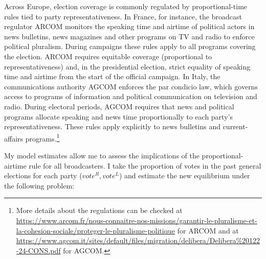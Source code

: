 \documentclass[12pt]{article}
\begin{document}
Across Europe, election coverage is commonly regulated by proportional-time rules tied to party representativeness. In France, for instance, the broadcast regulator ARCOM monitors  the speaking time and airtime of political actors in news bulletins, news magazines and other programs on TV and radio to enforce political pluralism. During campaigns these rules apply to all programs covering the election. ARCOM requires equitable coverage (proportional to representativeness) and, in the presidential election, strict equality of speaking time and airtime from the start of the official campaign. In Italy, the communications authority AGCOM enforces the par condicio law, which governs access to programs of information and political communication on television and radio. During electoral periods, AGCOM requires that news and political programs allocate speaking and news time proportionally to each party’s representativeness. These rules apply explicitly to news bulletins and current-affairs programs.\footnote{More details about the regulations can be checked at  \href{https://www.arcom.fr/nous-connaitre-nos-missions/garantir-le-pluralisme-et-la-cohesion-sociale/proteger-le-pluralisme-politique}{https://www.arcom.fr/nous-connaitre-nos-missions/garantir-le-pluralisme-et-la-cohesion-sociale/proteger-le-pluralisme-politique} for ARCOM and at \href{https://www.agcom.it/sites/default/files/migration/delibera/Delibera\%20122-24-CONS.pdf}{https://www.agcom.it/sites/default/files/migration/delibera/Delibera\%20122-24-CONS.pdf} for AGCOM. }






My model estimates allow me to assess the  implications of the proportional-airtime rule for all broadcasters.  I take the proportion of votes in the past general elections for each party ($vote^R,vote^L$) and estimate the new equilibrium under the following problem: 
\end{document}
